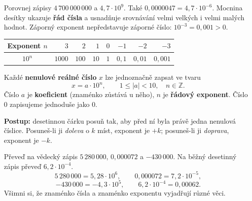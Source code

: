\documentclass[11pt,a4paper]{article}
\begin{document}

Porovnej zápisy $4\,700\,000\,000$ a $4{,}7\cdot10^9$.
Také $0{,}0000047=4{,}7\cdot10^{-6}$. Mocnina desítky
ukazuje \textbf{řád čísla} a usnadňuje srovnávání velmi velkých
i velmi malých hodnot. Záporný exponent nepředstavuje záporné číslo:
$10^{-3}=0{,}001>0$.

\begin{center}\small
\begin{tabular}{@{}c|rrrrrrr@{}}
\toprule
Exponent $n$ & $3$ & $2$ & $1$ & $0$ & $-1$ & $-2$ & $-3$\\\midrule
$10^n$ & $1000$ & $100$ & $10$ & $1$ & $0{,}1$ & $0{,}01$ & $0{,}001$\\
\bottomrule
\end{tabular}
\end{center}

\begin{definiceBox}[title={Definice - Vědecký zápis čísla}]
Každé \textbf{nenulové reálné číslo} $x$ lze jednoznačně zapsat ve tvaru
\[
\boxed{x=a\cdot10^n,\qquad 1\le |a|<10,\quad n\in\mathbb Z.}
\]
Číslo $a$ je \textbf{koeficient} (znaménko zůstává u něho),
$n$ je \textbf{řádový exponent}. Číslo $0$ zapisujeme jednoduše jako $0$.
\end{definiceBox}
\textbf{Postup:} desetinnou čárku posuň tak, aby před ní byla právě
jedna nenulová číslice. Posuneš-li ji \emph{doleva} o $k$ míst,
exponent je $+k$; posuneš-li ji \emph{doprava}, exponent je $-k$.

\begin{prikladReseniBox}[breakable=false,title={Příklad 1}]
Převeď na vědecký zápis $5\,280\,000$,
$0{,}000072$ a $-430\,000$.
Na běžný desetinný zápis převeď $6{,}2\cdot10^{-4}$.
\tcblower
\[
5\,280\,000=\boxed{5{,}28\cdot10^6},\qquad
0{,}000072=\boxed{7{,}2\cdot10^{-5}},
\]
\[
-430\,000=\boxed{-4{,}3\cdot10^5},\qquad
6{,}2\cdot10^{-4}=\boxed{0{,}00062}.
\]
Všimni si, že znaménko čísla a znaménko exponentu vyjadřují různé věci.
\end{prikladReseniBox}
\end{document}
